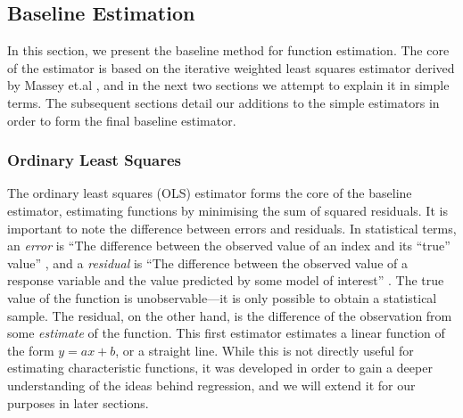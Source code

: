 \documentclass[a4paper,11pt,twoside]{article}
\begin{document}
\subsection{Baseline Estimation}
\label{sec-4-1}

   In this section, we present the baseline method for function estimation. The
   core of the estimator is based on the iterative weighted least squares
   estimator derived by Massey et.al \cite{massey1996estimating}, and in the
   next two sections we attempt to explain it in simple terms. The subsequent
   sections detail our additions to the simple estimators in order to form the
   final baseline estimator.
\subsubsection{Ordinary Least Squares}
\label{sec-4-1-1}

    The ordinary least squares (OLS) estimator forms the core of the baseline
    estimator, estimating functions by minimising the sum of squared
    residuals. It is important to note the difference between errors and
    residuals. In statistical terms, an \emph{error} is ``The difference between
    the observed value of an index and its ``true'' value'' \cite{2008oecd}, and
    a \emph{residual} is ``The difference between the observed value of a
    response variable and the value predicted by some model of interest''
    \cite{everitt2010cambridge}. The true value of the function is
    unobservable---it is only possible to obtain a statistical sample. The
    residual, on the other hand, is the difference of the observation from some
    \emph{estimate} of the function. This first estimator estimates a linear
    function of the form $y=ax+b$, or a straight line. While this is not
    directly useful for estimating characteristic functions, it was developed in
    order to gain a deeper understanding of the ideas behind regression, and we
    will extend it for our purposes in later sections.
\end{document}
